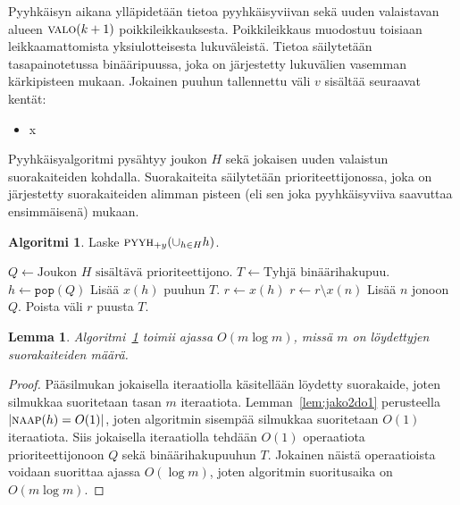 \documentclass[finnish]{tktltiki2}
\newtheorem{lem}[lau]{Lemma}
\theoremstyle{definition}
\newtheorem{alg}[lau]{Algoritmi}
\theoremstyle{remark}
\newcommand\size[1]{\ensuremath{\left |#1\right |}\xspace}
\newcommand\reach[1]{\ensuremath{\textsc{valo}(#1)}\xspace}
\newcommand\xrange[1]{\ensuremath{x(#1)}\xspace}
\newcommand\nbs[1]{\ensuremath{\textsc{naap}{(#1)}}\xspace}
\newcommand\nbsd[2]{\ensuremath{\textsc{naap}_{#2}{(#1)}}\xspace}
\newcommand\sweep[2]{\ensuremath{\textsc{pyyh}_{#2}{(#1)}}\xspace}
\begin{document}
Pyyhkäisyn aikana ylläpidetään tietoa pyyhkäisyviivan sekä uuden valaistavan alueen \reach{k+1} poikkileikkauksesta.
Poikkileikkaus muodostuu toisiaan leikkaamattomista yksiulotteisesta lukuväleistä.
Tietoa säilytetään tasapainotetussa binääripuussa, joka on järjestetty lukuvälien vasemman kärkipisteen mukaan.
Jokainen puuhun tallennettu väli $v$ sisältää seuraavat kentät:
\begin{itemize}
\item x
\end{itemize}

Pyyhkäisyalgoritmi pysähtyy joukon $H$ sekä jokaisen uuden valaistun suorakaiteiden kohdalla.
Suorakaiteita säilytetään prioriteettijonossa, joka on järjestetty suorakaiteiden alimman pisteen (eli sen joka pyyhkäisyviiva saavuttaa ensimmäisenä) mukaan.

\begin{alg}\label{alg:light2d}
Laske $\sweep{\cup_{h\in H}h}{+y}$.
\begin{algorithmic}
\State $Q\gets\text{Joukon $H$ sisältävä prioriteettijono}$.
\State $T\gets\text{Tyhjä binäärihakupuu}$.
	\State $h\gets \texttt{pop}(Q)$
		\State Lisää \xrange{h} puuhun $T$.
	\EndIf
	\State $r\gets\xrange{h}$
	\ForAll{$n\in\nbsd{h}{+y}$}
		\State $r\gets r\setminus\xrange{n}$
		\If{$\xrange{n}\cap T\neq\emptyset$}
				\State Lisää $n$ jonoon $Q$.
			\EndIf
		\EndIf
	\EndFor
	\State Poista väli $r$ puusta $T$.
\EndWhile
\end{algorithmic}
\end{alg}

\begin{lem}\label{lem:light2dtime}Algoritmi~\ref{alg:light2d} toimii ajassa $O(m\log m)$, missä $m$ on löydettyjen suorakaiteiden määrä.\end{lem}
\begin{proof}
Pääsilmukan jokaisella iteraatiolla käsitellään löydetty suorakaide, joten silmukkaa suoritetaan tasan $m$ iteraatiota.
Lemman~\ref{lem:jako2do1} perusteella $\size{\nbs{h}=O(1)}$, joten algoritmin sisempää silmukkaa suoritetaan $O(1)$ iteraatiota.
Siis jokaisella iteraatiolla tehdään $O(1)$ operaatiota prioriteettijonoon $Q$ sekä binäärihakupuuhun $T$.
Jokainen näistä operaatioista voidaan suorittaa ajassa $O(\log m)$, joten algoritmin suoritusaika on $O(m\log m)$.
\end{proof}
\end{document}
